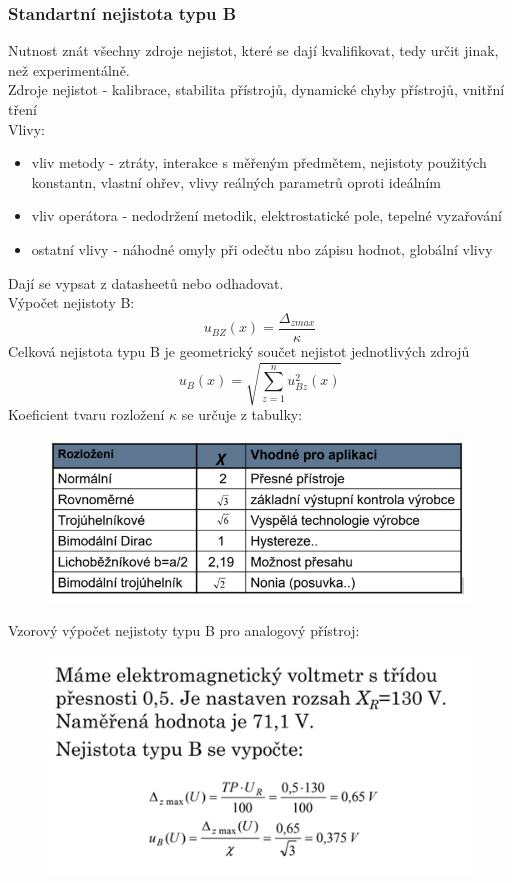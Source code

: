 \subsubsection*{Standartní nejistota typu B}
Nutnost znát všechny zdroje nejistot, které se dají kvalifikovat, tedy určit jinak, než experimentálně.\\
Zdroje nejistot - kalibrace, stabilita přístrojů, dynamické chyby přístrojů, vnitřní tření\\
Vlivy:
\begin{itemize}
    \item vliv metody - ztráty, interakce s měřeným předmětem, nejistoty použitých konstantn, vlastní ohřev, vlivy reálných parametrů oproti ideálním
    \item vliv operátora - nedodržení metodik, elektrostatické pole, tepelné vyzařování
    \item ostatní vlivy - náhodné omyly při odečtu nbo zápisu hodnot, globální vlivy
\end{itemize}
Dají se vypsat z datasheetů nebo odhadovat.\\
Výpočet nejistoty B:
\begin{equation}
    u_{BZ}(x) = \frac{\Delta_{zmax}}{\kappa}
\end{equation}
Celková nejistota typu B je geometrický součet nejistot jednotlivých zdrojů
\begin{equation}
    u_B(x) = \sqrt{\sum^n_{z=1}u^2_{Bz}(x)}
\end{equation}
Koeficient tvaru rozložení $\kappa$ se určuje z tabulky:
\begin{figure}[H]
    \includegraphics[scale = 1]{images/koef_rozlozeni.png}
\end{figure}
\newpage
Vzorový výpočet nejistoty typu B pro analogový přístroj:
\begin{figure}[H]
    \centering
    \includegraphics[scale = 1]{images/nejistotaB_analog.png}
\end{figure}
